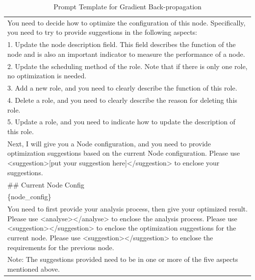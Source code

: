 \documentclass{article}
\begin{document}
\begin{table}[htbp]
{\begin{tabular}{p{15cm}}
You need to decide how to optimize the configuration of this node. Specifically, you need to try to provide suggestions in the following aspects:\\
1. Update the node description field. This field describes the function of the node and is also an important indicator to measure the performance of a node.\\
2. Update the scheduling method of the role. Note that if there is only one role, no optimization is needed.\\
3. Add a new role, and you need to clearly describe the function of this role.\\
4. Delete a role, and you need to clearly describe the reason for deleting this role.\\
5. Update a role, and you need to indicate how to update the description of this role.\par\\


Next, I will give you a Node configuration, and you need to provide optimization suggestions based on the current Node configuration. Please use <suggestion>[put your suggestion here]</suggestion> to enclose your suggestions.\par\\

\#\# Current Node Config\\
\{node\_config\}\par\\

You need to first provide your analysis process, then give your optimized result. Please use <analyse></analyse> to enclose the analysis process. Please use <suggestion></suggestion> to enclose the optimization suggestions for the current node. Please use <suggestion></suggestion> to enclose the requirements for the previous node.\\

Note: The suggestions provided need to be in one or more of the five aspects mentioned above.\\
    \bottomrule
    \end{tabular}}
    \caption{Prompt Template for Gradient Back-propagation}
    \label{tab:prompt_back_propagation}
\end{table}
\end{document}
